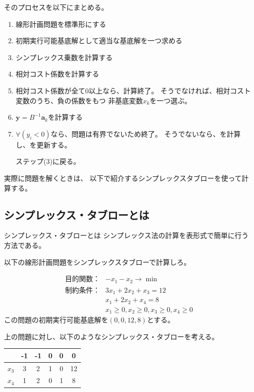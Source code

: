 \documentclass[9pt]{ltjsreport}
\begin{document}
そのプロセスを以下にまとめる。
\begin{tcolorbox}[title=シンプレックス法のアルゴリズム(まとめ)]
\begin{enumerate}
    \item 線形計画問題を標準形にする
    \item 初期実行可能基底解として適当な基底解を一つ求める
    \item シンプレックス乗数を計算する
    \item 相対コスト係数を計算する
    \item 相対コスト係数が全て0以上なら、計算終了。
    そうでなければ、相対コスト変数のうち、負の係数をもつ
    非基底変数$x_k$を一つ選ぶ。
    \item $\bm{y}=B^{-1}\bm{a}_k$を計算する
    \item $\forall (y_i<0)$なら、問題は有界でないため終了。
    そうでないなら、\theta を計算し、を更新する。

    ステップ(3)に戻る。
\end{enumerate}
\end{tcolorbox}
実際に問題を解くときは、
以下で紹介するシンプレックスタブローを使って計算する。

\newpage

\subsection{シンプレックス・タブローとは}
シンプレックス・タブローとは
シンプレックス法の計算を表形式で簡単に行う方法である。

以下の線形計画問題をシンプレックスタブローで計算しろ。

\begin{align}
    \text{目的関数：}&-x_1-x_2\longrightarrow \min \\
    \text{制約条件：}&3x_1+2x_2+x_3=12\\
                   &x_1+2x_2+x_4=8\\
                   &x_1\ge 0,x_2\ge 0,x_3\ge 0,x_4\ge 0
\end{align}
この問題の初期実行可能基底解を$(0,0,12,8)$とする。

\hrulefill

上の問題に対し、以下のようなシンプレックス・タブローを考える。
\begin{table}[h]
        \centering
        \begin{tabular}{ccccc|c}\toprule
            &-1&-1&0&0&0\\ \midrule
            $x_3$&3&2&1&0&12\\
            $x_4$&1&2&0&1&8 \\ \bottomrule
        \end{tabular}
\end{table}
\end{document}
